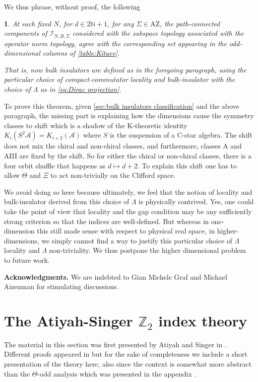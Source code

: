 \documentclass[a4paper,10pt]{article}
\numberwithin{equation}{section}
\theoremstyle{plain}
\newtheorem{thm}{\protect\theoremname}[section]
\theoremstyle{plain}
\theoremstyle{plain}
\theoremstyle{plain}
\theoremstyle{plain}
\theoremstyle{remark}
\theoremstyle{definition}
\theoremstyle{plain}
\providecommand{\theoremname}{Theorem}
\newcommand{\ZZ}{\mathbb{Z}}
\newcommand{\NN}{\mathbb{N}}
\newcommand{\calA}{\mathcal{A}}
\newcommand{\calI}{\mathcal{I}}
\begin{document}
	We thus phrase, without proof, the following
	\begin{thm}
		At each fixed $N$, for $d\in2\NN+1$, for any $\Sigma\in\mathrm{AZ}$, the path-connected components of $\calI_{N,B,\Sigma}$ considered with the subspace topology associated with the operator norm topology, agree with the corresponding set appearing in the odd-dimensional columns of \cref{table:Kitaev}. 
		
		That is, now bulk insulators are defined as in the foregoing paragraph, using the particular choice of compact-commutator locality and bulk-insulator with the choice of $\Lambda$ as in \cref{eq:Dirac projection}.
	\end{thm}
	To prove this theorem, given \cref{sec:bulk insulators classification} and the above paragraph, the missing part is explaining how the dimensions cause the symmetry classes to shift which is a shadow of the K-theoretic identity $K_i(S^2 \calA) = K_{i+2}(\calA)$ where $S$ is the suspension of a C-star algebra. The shift does not mix the chiral and non-chiral classes, and furthermore, classes A and AIII are fixed by the shift. So for either the chiral or non-chiral classes, there is a four orbit shuffle that happens as $d\mapsto d+2$. To explain this shift one has to allow $\Theta$ and $\Xi$ to act non-trivially on the Clifford space.
	
	We avoid doing so here because ultimately, we feel that the notion of locality and bulk-insulator derived from this choice of $\Lambda$ is physically contrived. Yes, one could take the point of view that locality and the gap condition may be any sufficiently strong criterion so that the indices are well-defined. But whereas in one-dimension this still made sense with respect to physical real space, in higher-dimensions, we simply cannot find a way to justify this particular choice of $\Lambda$ locality and $\Lambda$ non-triviality. We thus postpone the higher dimensional problem to future work.
	
	
	
	
	\bigskip
	\bigskip
	\noindent\textbf{Acknowledgments.} 
	We are  indebted to Gian Michele Graf and Michael Aizenman for stimulating discussions.
	\bigskip
	\appendix
	
	
	\section{The Atiyah-Singer $\ZZ_2$ index theory}\label{sec:Atiyah-Singer Z2 index theory}
	
	The material in this section was first presented by Atiyah and Singer in \cite{AtiyahSinger1969}. Different proofs appeared in \cite{Schulz-Baldes2015,FSSWY22} but for the sake of completeness we include a short presentation of the theory here, also since the context is somewhat more abstract than the $\Theta$-odd analysis which was presented in the appendix \cite{FSSWY22}.
	
\end{document}
